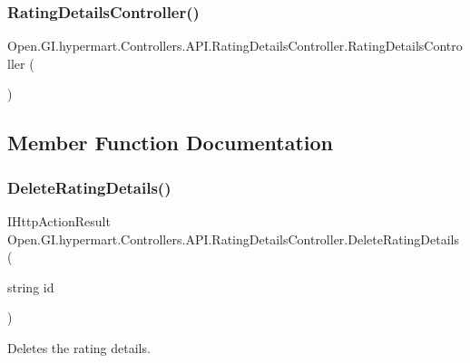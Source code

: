 \subsubsection{\texorpdfstring{Rating\+Details\+Controller()}{RatingDetailsController()}\hspace{0.1cm}{\footnotesize\ttfamily [2/2]}}
{\footnotesize\ttfamily Open.\+G\+I.\+hypermart.\+Controllers.\+A\+P\+I.\+Rating\+Details\+Controller.\+Rating\+Details\+Controller (\begin{DoxyParamCaption}{ }\end{DoxyParamCaption})}



\subsection{Member Function Documentation}
\hypertarget{class_open_1_1_g_i_1_1hypermart_1_1_controllers_1_1_a_p_i_1_1_rating_details_controller_aa92516d49a489314191626dc9cdb4a34}{}\label{class_open_1_1_g_i_1_1hypermart_1_1_controllers_1_1_a_p_i_1_1_rating_details_controller_aa92516d49a489314191626dc9cdb4a34} 
\subsubsection{\texorpdfstring{Delete\+Rating\+Details()}{DeleteRatingDetails()}}
{\footnotesize\ttfamily I\+Http\+Action\+Result Open.\+G\+I.\+hypermart.\+Controllers.\+A\+P\+I.\+Rating\+Details\+Controller.\+Delete\+Rating\+Details (\begin{DoxyParamCaption}\item[{string}]{id }\end{DoxyParamCaption})}



Deletes the rating details. 


